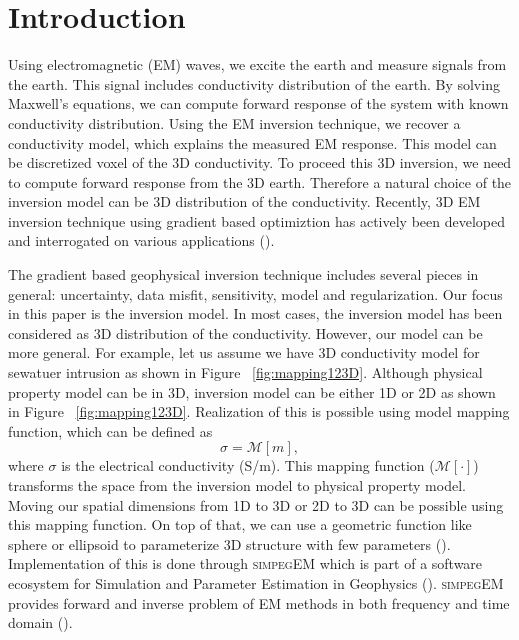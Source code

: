 \documentclass{segabs}
\newcommand{\simpegEM}{\textsc{simpegEM}\xspace}
\begin{document}
\section{Introduction}
Using electromagnetic (EM) waves, we excite the earth and measure signals from the earth.
This signal includes conductivity distribution of the earth. By solving Maxwell's
equations, we can compute forward response of the system with known conductivity
distribution.
Using the EM inversion technique, we recover a conductivity model, which explains the
measured EM response.
This model can be discretized voxel of the 3D conductivity.
To proceed this 3D inversion, we need to compute forward response from the 3D earth.
Therefore a natural choice of the inversion model can be 3D distribution of the conductivity.
Recently, 3D EM inversion technique using gradient based optimiztion has actively been
developed and interrogated on various applications (\cite{Doug2013,Gribenko2007,Chung2014}).

The gradient based geophysical inversion technique includes several pieces in general:
uncertainty, data misfit, sensitivity, model and regularization.
Our focus in this paper is the inversion model.
In most cases, the inversion model has been considered as 3D distribution of the conductivity.
However, our model can be more general. For example, let us assume we have 3D conductivity
model for sewatuer intrusion as shown in Figure ~\ref{fig:mapping123D}.
Although physical property model can be in 3D, inversion model can be either 1D or 2D
as shown in Figure ~\ref{fig:mapping123D}.
Realization of this is possible using model mapping function, which can be defined as
\begin{equation}
  \sigma  = \mathcal{M}[m],
\end{equation}
where $\sigma$ is the electrical conductivity (S/m). This mapping function
($\mathcal{M}[\cdot]$) transforms the space from the inversion model to physical property
model. Moving our spatial dimensions from 1D to 3D or 2D to 3D can be possible using this
mapping function. On top of that, we can use a geometric function like sphere or
ellipsoid to parameterize 3D structure with few parameters (\cite{MikeParam2014}).
Implementation of this is done through \simpegEM which is part of a software ecosystem
for Simulation and Parameter Estimation in Geophysics (\cite{SimPEG}).
\simpegEM provides forward and inverse problem of EM methods in both frequency and time domain (\cite{SimPEGEM}).
\end{document}
